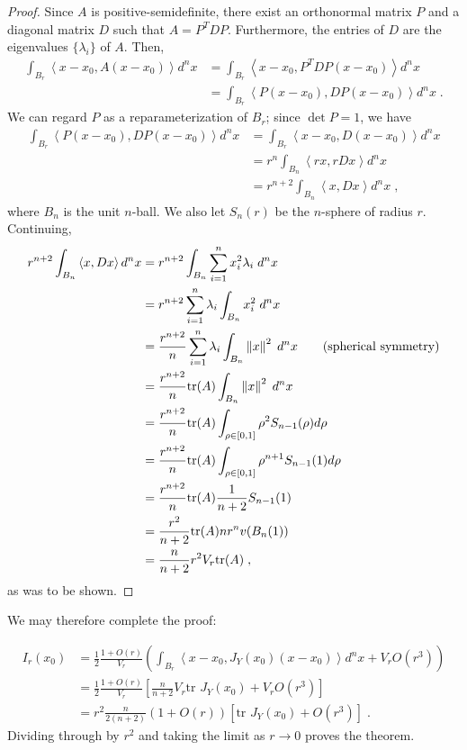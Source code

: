\documentclass[english]{scrartcl}
\begin{document}
	\begin{proof}
		Since $A$ is positive-semidefinite, there exist an orthonormal matrix $P$ and a diagonal matrix $D$ such that $A = P^TDP$. Furthermore, the entries of $D$ are the eigenvalues $\{\lambda_i\}$ of $A$. Then, 
		\begin{align*}
			\int_{B_r} \left< x - x_0, A(x-x_0) \right> d^n x &= \int_{B_r} \left< x - x_0, P^T DP(x-x_0) \right> d^n x\\
			&= \int_{B_r} \left< P(x - x_0),  DP(x-x_0) \right> d^n x \;.
		\end{align*}
		We can regard $P$ as a reparameterization of $B_r$; since $\det P = 1$, we have 
		\begin{align*}
			\int_{B_r} \left< P(x - x_0),  DP(x-x_0) \right> d^n x &= \int_{B_r} \left< x - x_0,  D(x-x_0) \right> d^n x \\
			&= r^n\int_{B_n} \left< rx, rDx \right> d^n x \\
			&= r^{n+2}\int_{B_n} \left< x, Dx \right> d^n x \;,
		\end{align*}
		where $B_n$ is the unit $n$-ball. We also let $S_n(r)$ be the $n$-sphere of radius $r$. Continuing, 
		\begin{align*}
			r^{n+2}\int_{B_n} \left< x, Dx \right> d^n x &= r^{n+2} \int_{B_n} \sum_{i= 1}^n x_i^2 \lambda_i \; d^nx \\
			&= r^{n+2} \sum_{i = 1}^n \lambda _i \int_{B_n} x_i^2 \; d^nx \\
			&= \frac{r^{n+2}}{n} \sum_{i = 1}^n \lambda _i \int_{B_n} \left\lVert x\right\rVert^2 \; d^nx \tag{spherical symmetry} \\
			&= \frac{r^{n+2}}{n} \text{tr}(A)  \int_{B_n} \left\lVert x\right\rVert^2 \; d^nx \\ 
			&= \frac{r^{n+2}}{n} \text{tr} (A) \int_{\rho \in [0,1]} \rho^2 S_{n-1}(\rho) d\rho \\
			&= \frac{r^{n+2}}{n} \text{tr} (A) \int_{\rho \in [0,1]} \rho^{n+1} S_{n-1}(1) d\rho \\
			&= \frac{r^{n+2}}{n} \text{tr} (A)  \frac{1}{n+2} S_{n-1}(1) \\
			&= \frac{r^2}{n+2}  \text{tr} (A)  n r^{n}v(B_n(1)) \\
			&= \frac{n}{n+2} r^{2} V_r \text{tr} (A)\;,
		\end{align*}
		as was to be shown. 
	\end{proof}

	We may therefore complete the proof: 

	\begin{align*}
		I_r(x_0) &= \frac{1}{2}\frac{1 + O(r)}{V_r} \left(\int_{B_r}  \left<x - x_0, J_Y(x_0)(x - x_0)\right> d^n x + V_rO(r^3)\right) \\ 
		&= \frac{1}{2}\frac{1 + O(r)}{V_r} \left[\frac{n}{n+2} V_r \text{tr } J_Y(x_0) + V_rO(r^3)\right] \\
		&= r^2 \frac{n}{2(n+2)} \left(1 + O(r)\right)\left[\text{tr }J_Y(x_0) + O(r^3) \right]\;.
	\end{align*}
	Dividing through by $r^2$ and taking the limit as $r\rightarrow 0$ proves the theorem.	 
\end{document}
